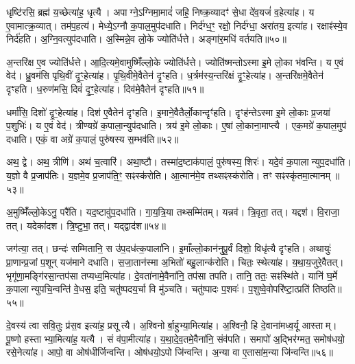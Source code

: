 धृष्टि॑रसि॒ ब्रह्म॑ य॒च्छेत्या॑ह॒ धृत्यै।
अपाग्ने॒\-ऽग्निमा॒मादं॑ जहि॒ निष्क्र॒व्यादꣳ॑ से॒धा दे॑व॒यजं॑ व॒हेत्या॑ह।
य ए॒वामात्क्र॒व्यात्।
तम॑प॒हत्य॑।
मेध्ये॒\-ऽग्नौ क॒पाल॒मुप॑दधाति।
निर्द॑ग्ध॒ꣳ॒ रक्षो॒ निर्द॑ग्धा॒ अरा॑तय॒ इत्या॑ह।
रक्षाꣴ॑स्ये॒व निर्द॑हति।
अ॒ग्नि॒वत्युप॑दधाति।
अ॒स्मिन्ने॒व लो॒के ज्योति॑र्धत्ते।
अङ्गा॑र॒मधि॑ वर्तयति॥५०॥

अ॒न्तरि॑क्ष ए॒व ज्योति॑र्धत्ते।
आ॒दि॒त्यमे॒वामुष्मिँ॑ल्लो॒के ज्योति॑र्धत्ते।
ज्योति॑ष्मन्तो\-ऽस्मा इ॒मे लो॒का भ॑वन्ति।
य ए॒वं वेद॑।
ध्रु॒वम॑सि पृथि॒वीं दृ॒ꣳ॒हेत्या॑ह।
पृ॒थि॒वीमे॒वैतेन॑ दृ॒ꣳहति।
ध॒र्त्रम॑स्य॒न्तरि॑क्षं दृ॒ꣳ॒हेत्या॑ह।
अ॒न्तरि॑क्षमे॒वैतेन॑ दृꣳहति।
ध॒रुण॑मसि॒ दिवं॑ दृ॒ꣳ॒हेत्या॑ह।
दिव॑मे॒वैतेन॑ दृꣳहति॥५१॥

धर्मा॑सि॒ दिशो॑ दृ॒ꣳ॒हेत्या॑ह।
दिश॑ ए॒वैतेन॑ दृꣳहति।
इ॒माने॒वैतैर्लो॒कान्दृꣳ॑हति।
दृꣳह॑न्ते\-ऽस्मा इ॒मे लो॒काः प्र॒जया॑ प॒शुभिः॑।
य ए॒वं वेद॑।
त्रीण्यग्रे॑ क॒पाला॒न्युप॑दधाति।
त्रय॑ इ॒मे लो॒काः।
ए॒षां लो॒काना॒माप्त्यै।
एक॒मग्रे॑ क॒पाल॒मुप॑ दधाति।
एकं॒ वा अग्रे॑ क॒पालं॒ पुरु॑षस्य स॒म्भव॑ति॥५२॥

अथ॒ द्वे।
अथ॒ त्रीणि॑।
अथ॑ च॒त्वारि॑।
अथा॒ष्टौ।
तस्मा॑द॒ष्टाक॑पालं॒ पुरु॑षस्य॒ शिरः॑।
यदे॒वं क॒पालान्युप॒दधा॑ति।
य॒ज्ञो वै प्र॒जाप॑तिः।
य॒ज्ञमे॒व प्र॒जाप॑ति॒ꣳ॒ सꣴस्क॑रोति।
आ॒त्मान॑मे॒व तथ्सꣴस्क॑रोति।
तꣳ सꣴस्कृ॑तमा॒त्मानम्॥५३॥

अ॒मुष्मिँ॑ल्लो॒केऽनु॒ परै॑ति।
यद॒ष्टावु॑प॒दधा॑ति।
गा॒य॒त्रि॒या तथ्सम्मि॑तम्।
यन्नव॑।
त्रि॒वृता॒ तत्।
यद्दश॑।
वि॒राजा॒ तत्।
यदेका॑दश।
त्रि॒ष्टुभा॒ तत्।
यद्द्वाद॑श॥५४॥

जग॑त्या॒ तत्।
छन्दः॑ सम्मितानि॒ स उ॑प॒दध॑त्क॒पाला॑नि।
इ॒माँल्लो॒कान॑नुपू॒र्वं दिशो॒ विधृ॑त्यै दृꣳहति।
अथायुः॑ प्रा॒णान्प्र॒जां प॒शून् यज॑माने दधाति।
स॒जा॒तान॑स्मा अ॒भितो॑ बहु॒लान्क॑रोति।
चितः॒ स्थेत्या॑ह।
य॒था॒य॒जुरे॒वैतत्।
भृगू॑णा॒मङ्गि॑रसा॒न्तप॑सा तप्यध्व॒मित्या॑ह।
दे॒वता॑नामे॒वैना॑नि॒ तप॑सा तपति।
तानि॒ ततः॒ सꣴस्थि॑ते।
यानि॑ घ॒र्मे क॒पालान्युपचि॒न्वन्ति॑ वे॒धस॒ इति॒ चतु॑ष्पदय॒र्चा वि मु॑ञ्चति।
चतु॑ष्पादः प॒शवः॑।
प॒शुष्वे॒वोपरि॑ष्टा॒त्प्रति॑ तिष्ठति॥५५॥

दे॒वस्य॑ त्वा सवि॒तुः प्र॑स॒व इत्या॑ह॒ प्रसूत्यै।
अ॒श्विनोर्बा॒हुभ्या॒मि\-त्या॑ह।
अ॒श्विनौ॒ हि दे॒वाना॑मध्व॒र्यू आस्ताम्।
पू॒ष्णो हस्ताभ्या॒मित्या॑ह॒ यत्यै।
सं व॑पा॒मीत्या॑ह।
य॒था॒दे॒व॒तमे॒वैना॑नि॒ संव॑पति।
समापो॑ अ॒द्भिर॑ग्मत॒ समोष॑धयो॒ रसे॒नेत्या॑ह।
आपो॒ वा ओष॑धीर्जिन्वन्ति।
ओष॑धयो॒ऽपो जि॑न्वन्ति।
अ॒न्या वा ए॒तासा॑म॒न्या जि॑न्वन्ति॥५६॥

